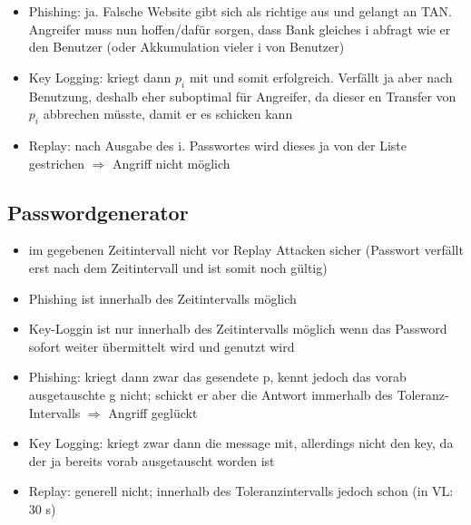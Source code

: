 \documentclass{scrartcl}
\begin{document}
\begin{itemize}
  \item  Phishing: ja. Falsche Website gibt sich als richtige aus und gelangt an TAN. Angreifer muss nun hoffen/dafür
  sorgen, dass Bank gleiches i abfragt wie er den Benutzer (oder Akkumulation vieler i von Benutzer)
  \item Key Logging: kriegt dann $p_{i}$ mit und somit erfolgreich. Verfällt ja aber nach Benutzung, deshalb eher
  suboptimal für Angreifer, da dieser en Transfer von $p_{i}$  abbrechen müsste, damit er es schicken kann
  \item Replay: nach Ausgabe des i. Passwortes wird dieses ja von der Liste gestrichen $\Rightarrow$ Angriff nicht
  möglich
\end{itemize}

\subsection*{Passwordgenerator}
\begin{itemize}
  \item im gegebenen Zeitintervall nicht vor Replay Attacken sicher (Passwort
    verfällt erst nach dem Zeitintervall und ist somit noch gültig)
  \item Phishing ist innerhalb des Zeitintervalls möglich
  \item Key-Loggin ist nur innerhalb des Zeitintervalls möglich wenn das
    Password sofort weiter übermittelt wird und genutzt wird
\end{itemize}

\begin{itemize}
  \item  Phishing:  kriegt dann zwar das gesendete p, kennt jedoch das vorab ausgetauschte g nicht; schickt er aber
  die Antwort immerhalb des Toleranz-Intervalls $\Rightarrow$  Angriff geglückt
  \item Key Logging:  kriegt zwar dann die message mit, allerdings nicht den key, da der ja bereits vorab ausgetauscht
  worden ist
  \item Replay: generell nicht; innerhalb des Toleranzintervalls jedoch schon (in VL: 30 s)
\end{itemize}
\end{document}
